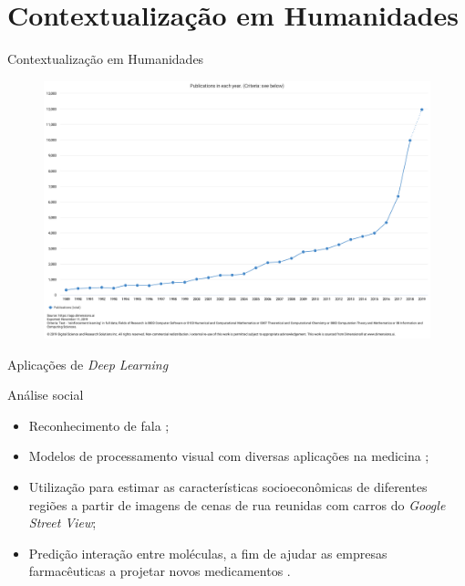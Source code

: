 \documentclass[aspectratio=169]{beamer}
\begin{document}
\section{Contextualização em Humanidades}
\begin{frame}{Contextualização em Humanidades}

	\begin{figure}[h]
	  \centering
	  \includegraphics[width=.7 \textwidth]{imgs/rl-publications-overview.pdf}
	  \label{publications-overview}
	 \end{figure}
\end{frame}

\begin{frame}{Aplicações de \textit{Deep Learning}}
	\begin{block}{Análise social}
		\begin{itemize}
			\item Reconhecimento de fala \cite{nassif:speech-rec:2019};
			\item Modelos de processamento visual com diversas aplicações na medicina \cite{Yeung:comp-vis:2019};
			\item Utilização para estimar as características socioeconômicas de diferentes regiões a partir de imagens de cenas de rua reunidas com carros do \textit{Google Street View};
			\item Predição interação entre moléculas, a fim de ajudar as empresas farmacêuticas a projetar novos medicamentos \cite{dahl2014multitask}.
		\end{itemize}
	\end{block}
\end{frame}
\end{document}
